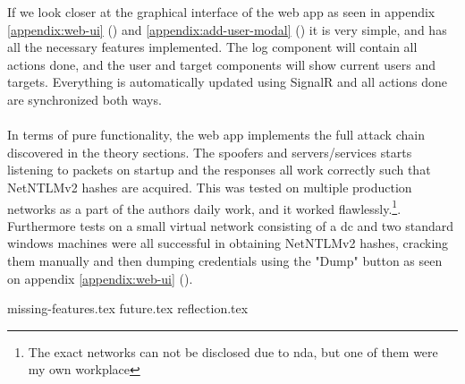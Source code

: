\documentclass{article}
\begin{document}
If we look closer at the graphical interface of the web app as seen in appendix \ref{appendix:web-ui} () and \ref{appendix:add-user-modal} () it is very simple, and has all the necessary features implemented. The log component will contain all actions done, and the user and target components will show current users and targets. Everything is automatically updated using SignalR and all actions done are synchronized both ways.
\\\\
In terms of pure functionality, the web app implements the full attack chain discovered in the theory sections. The spoofers and servers/services starts listening to packets on startup and the responses all work correctly such that NetNTLMv2 hashes are acquired. This was tested on multiple production networks as a part of the authors daily work, and it worked flawlessly.\footnote{The exact networks can not be disclosed due to \gls{nda}, but one of them were my own workplace}. Furthermore tests on a small virtual network consisting of a \gls{dc} and two standard windows machines were all successful in obtaining NetNTLMv2 hashes, cracking them manually and then dumping credentials using the "Dump" button as seen on appendix \ref{appendix:web-ui} ().

{missing-features.tex}
{future.tex}
{reflection.tex}
\end{document}
